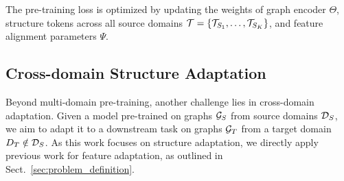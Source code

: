 The pre-training loss is optimized by updating the weights of graph encoder $\Theta$, structure tokens across all source domains %
$\mathcal{T}=\{\mathcal{T}_{S_1},\ldots,\mathcal{T}_{S_K}\}$, and feature alignment parameters $\Psi$.



\subsection{Cross-domain Structure Adaptation}
Beyond multi-domain pre-training, another challenge lies in cross-domain adaptation. Given a model pre-trained on graphs $\mathcal{G}_S$ from source domains $\mathcal{D}_S$, we aim to adapt it to a downstream task on graphs $\mathcal{G}_T$ from a target domain $D_T \notin \mathcal{D}_S$. 
As this work focuses on structure adaptation, we directly apply previous work  \cite{yu2024text} for feature adaptation, as outlined in Sect.~\ref{sec:problem_definition}. 


